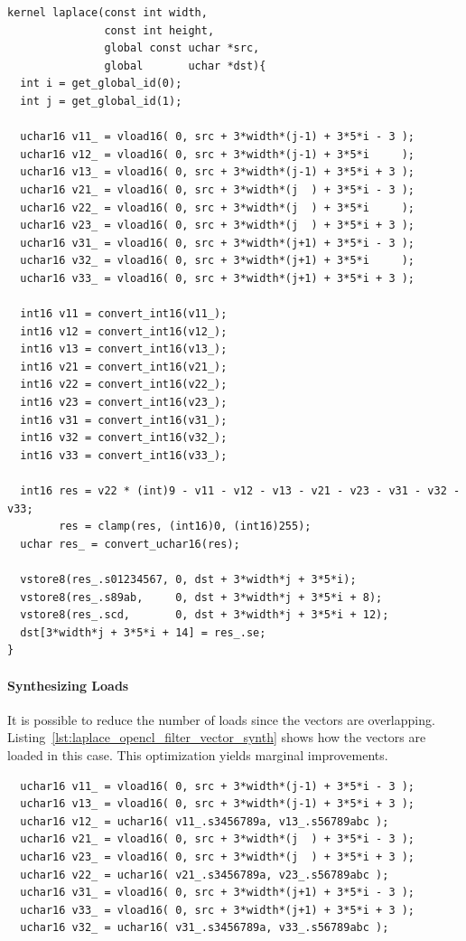\documentclass[11pt, a4paper, twoside]{montblanc}
\begin{document}
\begin{lstlisting}
kernel laplace(const int width,
               const int height,
               global const uchar *src,
               global       uchar *dst){
  int i = get_global_id(0);
  int j = get_global_id(1);

  uchar16 v11_ = vload16( 0, src + 3*width*(j-1) + 3*5*i - 3 );
  uchar16 v12_ = vload16( 0, src + 3*width*(j-1) + 3*5*i     );
  uchar16 v13_ = vload16( 0, src + 3*width*(j-1) + 3*5*i + 3 );
  uchar16 v21_ = vload16( 0, src + 3*width*(j  ) + 3*5*i - 3 );
  uchar16 v22_ = vload16( 0, src + 3*width*(j  ) + 3*5*i     );
  uchar16 v23_ = vload16( 0, src + 3*width*(j  ) + 3*5*i + 3 );
  uchar16 v31_ = vload16( 0, src + 3*width*(j+1) + 3*5*i - 3 );
  uchar16 v32_ = vload16( 0, src + 3*width*(j+1) + 3*5*i     );
  uchar16 v33_ = vload16( 0, src + 3*width*(j+1) + 3*5*i + 3 );

  int16 v11 = convert_int16(v11_);
  int16 v12 = convert_int16(v12_);
  int16 v13 = convert_int16(v13_);
  int16 v21 = convert_int16(v21_);
  int16 v22 = convert_int16(v22_);
  int16 v23 = convert_int16(v23_);
  int16 v31 = convert_int16(v31_);
  int16 v32 = convert_int16(v32_);
  int16 v33 = convert_int16(v33_);

  int16 res = v22 * (int)9 - v11 - v12 - v13 - v21 - v23 - v31 - v32 - v33;
        res = clamp(res, (int16)0, (int16)255);
  uchar res_ = convert_uchar16(res);

  vstore8(res_.s01234567, 0, dst + 3*width*j + 3*5*i);
  vstore8(res_.s89ab,     0, dst + 3*width*j + 3*5*i + 8);
  vstore8(res_.scd,       0, dst + 3*width*j + 3*5*i + 12);
  dst[3*width*j + 3*5*i + 14] = res_.se;
}
\end{lstlisting}

\paragraph{Synthesizing Loads} It is possible to reduce the number of loads
since the vectors are overlapping.
Listing~\ref{lst:laplace_opencl_filter_vector_synth} shows how the vectors are
loaded in this case. This optimization yields marginal improvements.

\begin{lstlisting}
  uchar16 v11_ = vload16( 0, src + 3*width*(j-1) + 3*5*i - 3 );
  uchar16 v13_ = vload16( 0, src + 3*width*(j-1) + 3*5*i + 3 );
  uchar16 v12_ = uchar16( v11_.s3456789a, v13_.s56789abc );
  uchar16 v21_ = vload16( 0, src + 3*width*(j  ) + 3*5*i - 3 );
  uchar16 v23_ = vload16( 0, src + 3*width*(j  ) + 3*5*i + 3 );
  uchar16 v22_ = uchar16( v21_.s3456789a, v23_.s56789abc );
  uchar16 v31_ = vload16( 0, src + 3*width*(j+1) + 3*5*i - 3 );
  uchar16 v33_ = vload16( 0, src + 3*width*(j+1) + 3*5*i + 3 );
  uchar16 v32_ = uchar16( v31_.s3456789a, v33_.s56789abc );
\end{lstlisting}
\end{document}
